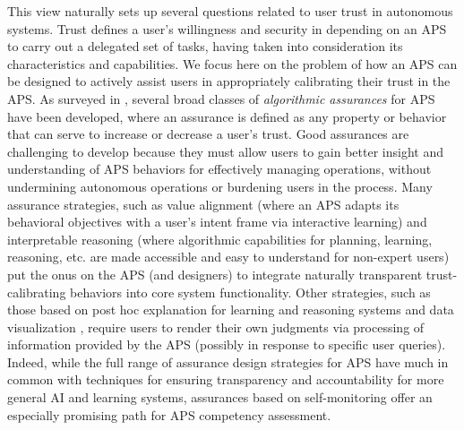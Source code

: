 This view naturally sets up several questions related to user trust in autonomous systems. Trust defines a user's willingness and security in depending on an APS to carry out a delegated set of tasks, having taken into consideration its characteristics and capabilities. 
We focus here on the problem of how an APS can be designed to actively assist users in appropriately calibrating their trust in the APS. As surveyed in \cite{Israelsen2017-ym}, several broad classes of \emph{algorithmic assurances} for APS have been developed, where an assurance is defined as any property or behavior that can serve to increase or decrease a user's trust. 
Good assurances are challenging to develop because they must allow users to gain better insight and understanding of APS behaviors for effectively managing operations, without undermining autonomous operations or burdening users in the process. 
Many assurance strategies, such as value alignment \cite{Dragan2014-gu} (where an APS adapts its behavioral objectives with a user's intent frame via interactive learning) and interpretable reasoning \cite{Ruping2006-xj} (where algorithmic capabilities for planning, learning, reasoning, etc. are made accessible and easy to understand for non-expert users) put the onus on the APS (and designers) to integrate naturally transparent trust-calibrating behaviors into core system functionality. 
Other strategies, such as those based on post hoc explanation for learning and reasoning systems \cite{Lacave2004-gq, Ribeiro2016-uc} and data visualization \cite{Sacha2017-hf}, require users to render their own judgments via processing of information provided by the APS (possibly in response to specific user queries). 
Indeed, while the full range of assurance design strategies for APS have much in common with techniques for ensuring transparency and accountability for more general AI and learning systems, assurances based on self-monitoring offer an especially promising path for APS competency assessment. 


